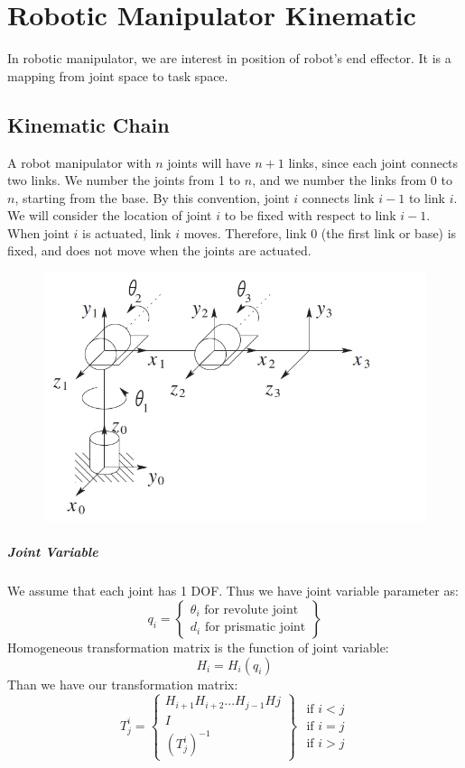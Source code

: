 \chapter{Robotic Manipulator Kinematic}
In robotic manipulator, we are interest in position of robot's end effector. It is a mapping from joint space to task space.

\section{Kinematic Chain}
A robot manipulator with $n$ joints will have $n + 1$ links, since each joint connects two links. We number the joints from 1 to $n$, and we number the links from 0 to $n$, starting from the base. By this convention, joint $i$ connects link $i - 1$ to link $i$. We will consider the location of joint $i$ to be ﬁxed with respect to link $i - 1$. When joint $i$ is actuated, link $i$ moves. Therefore, link 0 (the ﬁrst link or base) is ﬁxed, and does not move when the joints are actuated.
\begin{figure}[ht]
	\centering
	\includegraphics[width=0.5\linewidth]{src/arm/armfig1.png}
\end{figure}
\paragraph{Joint Variable} We assume that each joint has 1 DOF. Thus we have joint variable parameter as:
\[
q_i =
\begin{Bmatrix}
	\theta_i \text{ for revolute joint}\\
	d_i \text{ for prismatic joint}
\end{Bmatrix}
\]
Homogeneous transformation matrix is the function of joint variable:
\begin{equation}
	H_i = H_i(q_i)
\end{equation}
Than we have our transformation matrix:
\begin{equation}
	T_j^i = 
	\begin{Bmatrix}
		H_{i+1} H_{i+2}...H_{j-1} Hj  \\
		I \\
		(T_j^i)^{-1} 
	\end{Bmatrix}
	\begin{matrix}
		\text{ if } i<j\\
		\text{ if } i=j\\
		\text{ if } i>j
	\end{matrix}
\end{equation}
